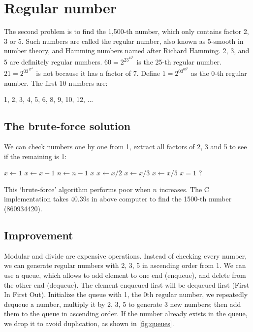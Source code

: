 \documentclass[b5paper]{article}
\begin{document}
\section*{Regular number}

The second problem is to find the 1,500-th number, which only contains factor 2, 3 or 5. Such numbers are called the regular number, also known as 5-smooth in number theory, and Hamming numbers named after Richard Hamming. 2, 3, and 5 are definitely regular numbers. $60 = 2^23^15^1$ is the 25-th regular number. $21 = 2^03^17^1$ is not because it has a factor of 7. Define $1=2^03^05^0$ as the 0-th regular number. The first 10 numbers are:

1, 2, 3, 4, 5, 6, 8, 9, 10, 12, ...

\subsection*{The brute-force solution}
We can check numbers one by one from 1, extract all factors of 2, 3 and 5 to see if the remaining is 1:

\begin{algorithmic}[1]
  \State $x \gets 1$
    \State $x \gets x + 1$
      \State $n \gets n - 1$
    \EndIf
  \EndWhile
  \State \Return $x$
\EndFunction
\Statex
{}
    \State $x \gets x / 2$
  \EndWhile
    \State $x \gets x / 3$
  \EndWhile
    \State $x \gets x / 5$
  \EndWhile
  \State \Return $x = 1$ ?
\EndFunction
\end{algorithmic}

This `brute-force' algorithm performs poor when $n$ increases. The C implementation takes 40.39s in above computer to find the 1500-th number (860934420).

\subsection*{Improvement}
Modular and divide are expensive\cite{Bentley} operations. Instead of checking every number, we can generate regular numbers with 2, 3, 5 in ascending order from 1. We can use a queue, which allows to add element to one end (enqueue), and delete from the other end (dequeue). The element enqueued first will be dequeued first (First In First Out). Initialize the queue with 1, the 0th regular number, we repeatedly dequeue a number, multiply it by 2, 3, 5 to generate 3 new numbers; then add them to the queue in ascending order. If the number already exists in the queue, we drop it to avoid duplication, as shown in \cref{fig:queues}.
\end{document}
